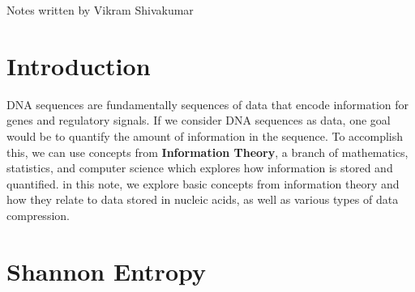 \documentclass[12pt]{article}
\begin{document}
\thispagestyle{plain}
   \newpage
   \setcounter{page}{1}
   \noindent
   \begin{center}
   \end{center}
   {Notes written by Vikram Shivakumar}
   \vspace*{4mm}


\section{Introduction}
DNA sequences are fundamentally sequences of data that encode information for genes and regulatory signals. If we consider DNA sequences as data, one goal would be to quantify the amount of information in the sequence. To accomplish this, we can use concepts from \textbf{Information Theory}, a branch of mathematics, statistics, and computer science which explores how information is stored and quantified. in this note, we explore basic concepts from information theory and how they relate to data stored in nucleic acids, as well as various types of data compression.

\section{Shannon Entropy}
\end{document}
